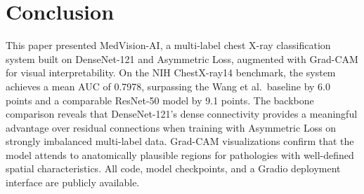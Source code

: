 \documentclass[runningheads]{llncs}
\begin{document}
\section{Conclusion}
\label{sec:conclusion}

This paper presented MedVision-AI, a multi-label chest X-ray
classification system built on DenseNet-121 and Asymmetric Loss,
augmented with Grad-CAM for visual interpretability. On the NIH
ChestX-ray14 benchmark, the system achieves a mean AUC of 0.7978,
surpassing the Wang et al.\ baseline by 6.0 points and a
comparable ResNet-50 model by 9.1 points. The backbone comparison
reveals that DenseNet-121's dense connectivity provides a
meaningful advantage over residual connections when training with
Asymmetric Loss on strongly imbalanced multi-label data. Grad-CAM
visualizations confirm that the model attends to anatomically
plausible regions for pathologies with well-defined spatial
characteristics. All code, model checkpoints, and a Gradio
deployment interface are publicly available.



\end{document}
